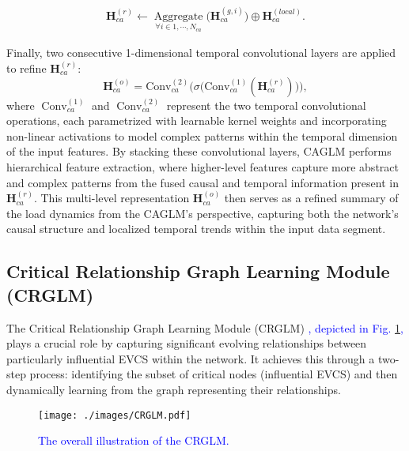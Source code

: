 \documentclass[lettersize,journal]{IEEEtran}
\newcommand{\hl}[1]{\textcolor{blue}{#1}}
\begin{document}
\begin{equation}
\begin{aligned}
\bm{H}^{(r)}_{ca} \leftarrow \underset{\forall i \in{1, \cdots, N_{ca}}}{\operatorname{Aggregate}}\Big(\bm{H}_{ca}^{(g, i)}\Big) \oplus \bm{H}^{(local)}_{ca}.
\end{aligned}
\label{eq:concat}
\end{equation}

Finally, two consecutive 1-dimensional temporal convolutional layers are applied to refine $\bm{H}^{(r)}_{ca}$:
\begin{equation}
\bm{H}^{(o)}_{ca} = \text{Conv}^{(2)}_{ca} \Big(\sigma \big( \text{Conv}^{(1)}_{ca} (\bm{H}^{(r)}_{ca} ) \big)\Big),
\label{eq:refine_representation}
\end{equation}
where $\operatorname{Conv}_{c a}^{(1)}$ and $\operatorname{Conv}_{c a}^{(2)}$ represent the two temporal convolutional operations, each parametrized with learnable kernel weights and incorporating non-linear activations to model complex patterns within the temporal dimension of the input features. By stacking these convolutional layers, CAGLM performs hierarchical feature extraction, where higher-level features capture more abstract and complex patterns from the fused causal and temporal information present in $\boldsymbol{H}_{c a}^{(r)}$. This multi-level representation $\boldsymbol{H}_{c a}^{(o)}$ then serves as a refined summary of the load dynamics from the CAGLM's perspective, capturing both the network's causal structure and localized temporal trends within the input data segment.



\subsection{Critical Relationship Graph Learning Module (CRGLM)} 
The Critical Relationship Graph Learning Module (CRGLM) 
\hl{, depicted in Fig. \ref{fig:CRGLM},} 
plays a crucial role by capturing significant evolving relationships between particularly influential EVCS within the network. It achieves this through a two-step process: identifying the subset of critical nodes (influential EVCS) and then dynamically learning from the graph representing their relationships.

\begin{figure} [t!]
	\centering
        \vspace{-10pt}
	\texttt{[image: ./images/CRGLM.pdf]}
	\caption{\hl{The overall illustration of the CRGLM.}}
	\vspace{-18pt}
	\label{fig:CRGLM}
\end{figure}
\end{document}

